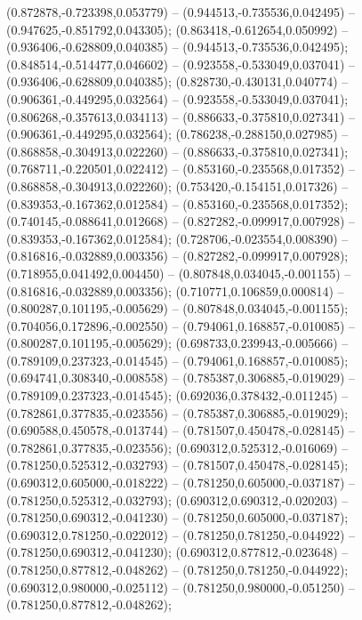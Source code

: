 (0.872878,-0.723398,0.053779) -- (0.944513,-0.735536,0.042495) -- (0.947625,-0.851792,0.043305);
 (0.863418,-0.612654,0.050992) -- (0.936406,-0.628809,0.040385) -- (0.944513,-0.735536,0.042495);
 (0.848514,-0.514477,0.046602) -- (0.923558,-0.533049,0.037041) -- (0.936406,-0.628809,0.040385);
 (0.828730,-0.430131,0.040774) -- (0.906361,-0.449295,0.032564) -- (0.923558,-0.533049,0.037041);
 (0.806268,-0.357613,0.034113) -- (0.886633,-0.375810,0.027341) -- (0.906361,-0.449295,0.032564);
 (0.786238,-0.288150,0.027985) -- (0.868858,-0.304913,0.022260) -- (0.886633,-0.375810,0.027341);
 (0.768711,-0.220501,0.022412) -- (0.853160,-0.235568,0.017352) -- (0.868858,-0.304913,0.022260);
 (0.753420,-0.154151,0.017326) -- (0.839353,-0.167362,0.012584) -- (0.853160,-0.235568,0.017352);
 (0.740145,-0.088641,0.012668) -- (0.827282,-0.099917,0.007928) -- (0.839353,-0.167362,0.012584);
 (0.728706,-0.023554,0.008390) -- (0.816816,-0.032889,0.003356) -- (0.827282,-0.099917,0.007928);
 (0.718955,0.041492,0.004450) -- (0.807848,0.034045,-0.001155) -- (0.816816,-0.032889,0.003356);
 (0.710771,0.106859,0.000814) -- (0.800287,0.101195,-0.005629) -- (0.807848,0.034045,-0.001155);
 (0.704056,0.172896,-0.002550) -- (0.794061,0.168857,-0.010085) -- (0.800287,0.101195,-0.005629);
 (0.698733,0.239943,-0.005666) -- (0.789109,0.237323,-0.014545) -- (0.794061,0.168857,-0.010085);
 (0.694741,0.308340,-0.008558) -- (0.785387,0.306885,-0.019029) -- (0.789109,0.237323,-0.014545);
 (0.692036,0.378432,-0.011245) -- (0.782861,0.377835,-0.023556) -- (0.785387,0.306885,-0.019029);
 (0.690588,0.450578,-0.013744) -- (0.781507,0.450478,-0.028145) -- (0.782861,0.377835,-0.023556);
 (0.690312,0.525312,-0.016069) -- (0.781250,0.525312,-0.032793) -- (0.781507,0.450478,-0.028145);
 (0.690312,0.605000,-0.018222) -- (0.781250,0.605000,-0.037187) -- (0.781250,0.525312,-0.032793);
 (0.690312,0.690312,-0.020203) -- (0.781250,0.690312,-0.041230) -- (0.781250,0.605000,-0.037187);
 (0.690312,0.781250,-0.022012) -- (0.781250,0.781250,-0.044922) -- (0.781250,0.690312,-0.041230);
 (0.690312,0.877812,-0.023648) -- (0.781250,0.877812,-0.048262) -- (0.781250,0.781250,-0.044922);
 (0.690312,0.980000,-0.025112) -- (0.781250,0.980000,-0.051250) -- (0.781250,0.877812,-0.048262);
